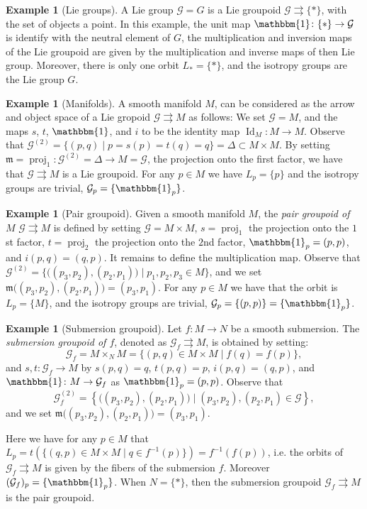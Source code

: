 \documentclass[12pt,a4paper,reqno]{amsart}
\DeclareMathOperator{\Id}{Id}
\DeclareMathOperator{\proj}{proj} %
\newcommand{\1}{\mathbbm{1}} %
\newcommand{\G}{\mathcal{G}} %
\newcommand{\m}{\mathfrak{m}} %
\theoremstyle{definition}
\newtheorem{example}[thm]{Example}
\theoremstyle{TheoremNum}
\begin{document}
\begin{example}[Lie groups]
A Lie group $\G=G$ is a Lie groupoid  $\G\rightrightarrows \{\ast\}$, with the set of objects a point. In this example, the unit map $\1\colon \{\ast\}\to \G$ is identify with the neutral element of $G$, the multiplication and inversion maps of the Lie groupoid are given by the multiplication and inverse maps of then Lie group. Moreover, there is only one orbit $L_\ast = \{\ast\}$, and the isotropy groups are the Lie group $G$.
\end{example} 

\begin{example}[Manifolds]
A smooth manifold $M$, can be considered as the arrow and object space of a Lie gropoid $\G\rightrightarrows M$ as follows: We set $\G = M$, and the maps $s$, $t$, $\1$, and  $i$ to be the identity map $\Id_M\colon M\to M$. Observe that $\G^{(2)} = \{(p,q)\mid p= s(p)= t(q) = q\} = \Delta\subset M\times M$. By setting $\m = \proj_1\colon \G^{(2)} = \Delta\to M=\G$, the projection onto the first factor, we have that $\G\rightrightarrows M$ is a Lie groupoid. For any $p\in M$ we have $L_p = \{p\}$ and the isotropy groups are trivial, $\G_p = \{\1_p\}$.
\end{example}

\begin{example}[Pair groupoid]\label{Ex: Pair groupoid 1}
Given a smooth manifold $M$, the \emph{pair groupoid of $M$} $\G\rightrightarrows M$ is defined by setting $\G = M\times M$, $s= \proj_1$ the projection onto the $1$st factor, $t=\proj_2$ the projection onto the $2$nd factor, $\1_p = (p,p)$, and $i(p,q) = (q,p)$. It remains to define the multiplication map. Observe that $\G^{(2)} = \{\big((p_3,p_2),(p_2,p_1)\big)\mid p_1,p_2,p_3\in M\}$, and we set $\m\big((p_3,p_2),(p_2,p_1)\big) = (p_3,p_1)$. For any $p\in M$ we have that the orbit is $L_p = \{M\}$, and the isotropy groups are trivial, $\G_p = \{(p,p)\}=\{\1_{p}\}$.
\end{example}

\begin{example}[Submersion groupoid]\label{Ex: Submersion grupoid}
Let $f\colon M\to N$ be a smooth submersion. The \emph{submersion groupoid of $f$}, denoted as $\G_f\rightrightarrows M$, is obtained by setting:
\[
	\G_f = M\times_N M = \{(p,q)\in M\times M\mid f(q) = f(p) \},
\]
and $s,t\colon \G_f\to M$ by $s(p,q) = q$, $t(p,q) = p$, $i(p,q) = (q,p)$, and $\1\colon M\to \G_f$ as $\1_p = (p,p)$. Observe that 
\[
\G_f^{(2)} = \left\{\big((p_3,p_2),(p_2,p_1)\big)\mid (p_3,p_2),(p_2,p_1)\in \G\right\},
\] 
and we set $\m\big((p_3,p_2),(p_2,p_1)\big) = (p_3,p_1)$.

Here we have for any $p\in M$ that $L_p = t(\{(q,p)\in M\times M\mid q\in f^{-1}(p)\}) = f^{-1}(f(p))$, i.e. the orbits of $\G_f\rightrightarrows M$ is given by the fibers of the submersion $f$. Moreover $(\G_f)_p = \{\1_p\}$.
When $N = \{\ast\}$, then the submersion groupoid $\G_f\rightrightarrows M$ is the pair groupoid.
\end{example}
\end{document}
